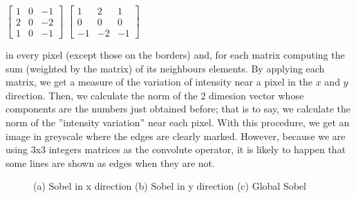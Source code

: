 \documentclass{article}
\begin{document}
\begin{enumerate}[label=5.\arabic*,leftmargin=*]
\begin{center}
$\begin{bmatrix}
    1 & 0 & -1\\
    2 & 0 & -2\\
    1 & 0 & -1
\end{bmatrix}$ \qquad $\begin{bmatrix}
        1 & 2 & 1\\
        0 & 0 & 0\\
       -1 & -2 & -1
\end{bmatrix}$
\end{center}
in every pixel (except those on the borders) and, for each matrix computing the sum (weighted by the matrix) of its neighbours elements. By applying each matrix, we get a measure of the variation of intensity near a pixel in the $x$ and $y$ direction. Then, we calculate the norm of the 2 dimesion vector whose components are the numbers just obtained before; that is to say, we calculate the norm of the ''intensity variation'' near each pixel. With this procedure, we get an image in greyscale where the edges are clearly marked. However, because we are using 3x3 integers matrices as the convolute operator, it is likely to happen that some lines are shown as edges when they are not. 


\begin{figure}[h!]
    \centering
    \caption{(a) Sobel in x direction (b) Sobel in y direction (c) Global Sobel}
    \label{fig:foobar}
    \label{sobel}
\end{figure}



\end{enumerate}
\end{document}
